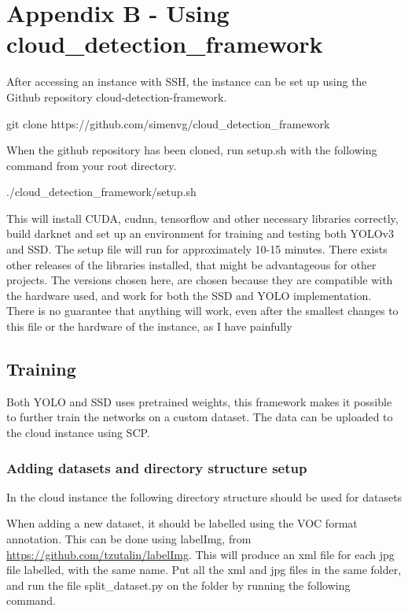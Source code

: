 \chapter{Appendix B - Using cloud\_detection\_framework}
After accessing an instance with SSH, the instance can be set up using the Github repository cloud-detection-framework. 

\begin{lcverbatim}
git clone https://github.com/simenvg/cloud\_detection\_framework
\end{lcverbatim}

When the github repository has been cloned, run setup.sh with the following command from your root directory.

\begin{lcverbatim}
./cloud\_detection\_framework/setup.sh
\end{lcverbatim}

This will install CUDA, cudnn, tensorflow and other necessary libraries correctly, build darknet and set up an environment for training and testing both YOLOv3 and SSD. The setup file will run for approximately 10-15 minutes. There exists other releases of the libraries installed, that might be advantageous for other projects. The versions chosen here, are chosen because they are compatible with the hardware used, and work for both the SSD and YOLO implementation. There is no guarantee that anything will work, even after the smallest changes to this file or the hardware of the instance, as I have painfully 

\section{Training}
Both YOLO and SSD uses pretrained weights, this framework makes it possible to further train the networks on a custom dataset. The data can be uploaded to the cloud instance using SCP. 
\newpage
\subsection{Adding datasets and directory structure setup}
In the cloud instance the following directory structure should be used for datasets



When adding a new dataset, it should be labelled using the VOC format annotation. This can be done using labelImg, from \url{https://github.com/tzutalin/labelImg}. This will produce an xml file for each jpg file labelled, with the same name. Put all the xml and jpg files in the same folder, and run the file split\_dataset.py on the folder by running the following command.

